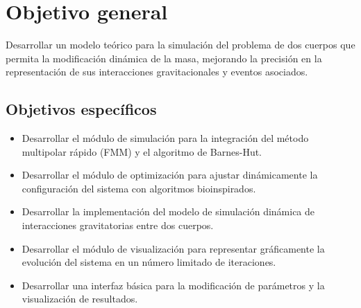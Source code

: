 \section{Objetivo general}
Desarrollar un modelo teórico para la simulación del problema de dos cuerpos que permita la modificación dinámica de la masa, mejorando la precisión en la representación de sus interacciones gravitacionales y eventos asociados.
\subsection{Objetivos específicos}
\begin{itemize}
    \item Desarrollar el módulo de simulación para la integración del método multipolar rápido (FMM) y el algoritmo de Barnes-Hut.
    
    \item Desarrollar el módulo de optimización para ajustar dinámicamente la configuración del sistema con algoritmos bioinspirados.

    \item Desarrollar la implementación del modelo de simulación dinámica de interacciones gravitatorias entre dos cuerpos.

    \item Desarrollar el módulo de visualización para representar gráficamente la evolución del sistema en un número limitado de iteraciones.

    \item Desarrollar una interfaz básica para la modificación de parámetros y la visualización de resultados.
\end{itemize}